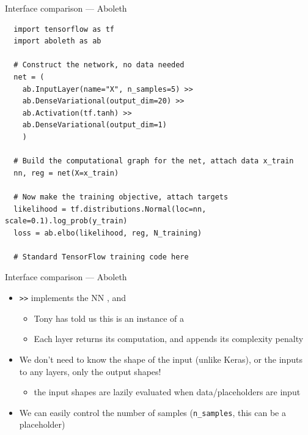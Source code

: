 \documentclass[lualatex, aspectratio=169]{beamer}
\begin{document}
\begin{frame}[fragile]{Interface comparison --- Aboleth}

  \begin{verbatim}
  import tensorflow as tf
  import aboleth as ab

  # Construct the network, no data needed
  net = (
    ab.InputLayer(name="X", n_samples=5) >>
    ab.DenseVariational(output_dim=20) >>
    ab.Activation(tf.tanh) >>
    ab.DenseVariational(output_dim=1)
    )

  # Build the computational graph for the net, attach data x_train
  nn, reg = net(X=x_train)

  # Now make the training objective, attach targets
  likelihood = tf.distributions.Normal(loc=nn, scale=0.1).log_prob(y_train)
  loss = ab.elbo(likelihood, reg, N_training)

  # Standard TensorFlow training code here

  \end{verbatim}

\end{frame}


\begin{frame}{Interface comparison --- Aboleth}
  
  \begin{itemize}
    \item \texttt{>>} implements the NN , and 
    \begin{itemize}
      \item Tony has told us this is an instance of a 
      \item Each layer returns its computation, and appends its complexity penalty
    \end{itemize}
    \item We don't need to know the shape of the input (unlike Keras), or the inputs to any layers, only the output shapes!
    \begin{itemize}
      \item the input shapes are lazily evaluated when data/placeholders are input
    \end{itemize}
    \item We can easily control the number of samples (\texttt{n\_samples}, this can be a placeholder)
  \end{itemize}

\end{frame}
\end{document}
